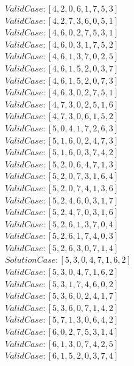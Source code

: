 \documentclass[10pt,a4paper]{article}
\begin{document}
				$Valid Case   : [4, 2, 0, 6, 1, 7, 5, 3]$\\
				$Valid Case   : [4, 2, 7, 3, 6, 0, 5, 1]$\\
				$Valid Case   : [4, 6, 0, 2, 7, 5, 3, 1]$\\
				$Valid Case   : [4, 6, 0, 3, 1, 7, 5, 2]$\\
				$Valid Case   : [4, 6, 1, 3, 7, 0, 2, 5]$\\
				$Valid Case   : [4, 6, 1, 5, 2, 0, 3, 7]$\\
				$Valid Case   : [4, 6, 1, 5, 2, 0, 7, 3]$\\
				$Valid Case   : [4, 6, 3, 0, 2, 7, 5, 1]$\\
				$Valid Case   : [4, 7, 3, 0, 2, 5, 1, 6]$\\
				$Valid Case   : [4, 7, 3, 0, 6, 1, 5, 2]$\\
				$Valid Case   : [5, 0, 4, 1, 7, 2, 6, 3]$\\
				$Valid Case   : [5, 1, 6, 0, 2, 4, 7, 3]$\\
				$Valid Case   : [5, 1, 6, 0, 3, 7, 4, 2]$\\
				$Valid Case   : [5, 2, 0, 6, 4, 7, 1, 3]$\\
				$Valid Case   : [5, 2, 0, 7, 3, 1, 6, 4]$\\
				$Valid Case   : [5, 2, 0, 7, 4, 1, 3, 6]$\\
				$Valid Case   : [5, 2, 4, 6, 0, 3, 1, 7]$\\
				$Valid Case   : [5, 2, 4, 7, 0, 3, 1, 6]$\\
				$Valid Case   : [5, 2, 6, 1, 3, 7, 0, 4]$\\
				$Valid Case   : [5, 2, 6, 1, 7, 4, 0, 3]$\\
				$Valid Case   : [5, 2, 6, 3, 0, 7, 1, 4]$\\
				$Solution Case: [5, 3, 0, 4, 7, 1, 6, 2]$\\
				$Valid Case   : [5, 3, 0, 4, 7, 1, 6, 2]$\\
				$Valid Case   : [5, 3, 1, 7, 4, 6, 0, 2]$\\
				$Valid Case   : [5, 3, 6, 0, 2, 4, 1, 7]$\\
				$Valid Case   : [5, 3, 6, 0, 7, 1, 4, 2]$\\
				$Valid Case   : [5, 7, 1, 3, 0, 6, 4, 2]$\\
				$Valid Case   : [6, 0, 2, 7, 5, 3, 1, 4]$\\
				$Valid Case   : [6, 1, 3, 0, 7, 4, 2, 5]$\\
				$Valid Case   : [6, 1, 5, 2, 0, 3, 7, 4]$\\
\end{document}
